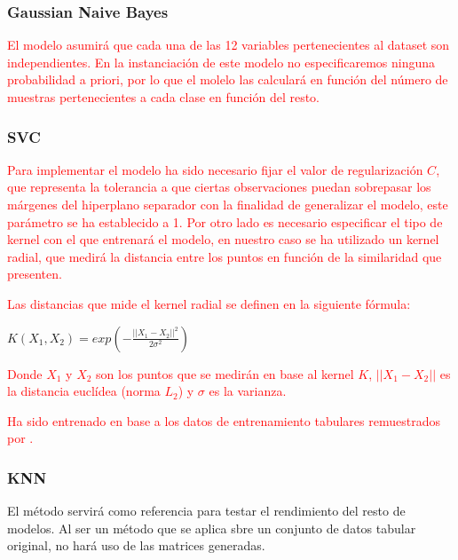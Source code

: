         \subsubsection{Gaussian Naive Bayes}

            \textcolor{red}{El modelo  asumirá que cada una de las 12 variables pertenecientes al dataset son independientes. En la instanciación de este modelo no especificaremos ninguna probabilidad a priori, por lo que el molelo las calculará en función del número de muestras pertenecientes a cada clase en función del resto.}


        \subsubsection{SVC}

            \textcolor{red}{Para implementar el modelo  ha sido necesario fijar el valor de regularización $C$, que representa la tolerancia a que ciertas observaciones puedan sobrepasar los márgenes del hiperplano separador con la finalidad de generalizar el modelo, este parámetro se ha establecido a 1. Por otro lado es necesario especificar el tipo de kernel con el que entrenará el modelo, en nuestro caso se ha utilizado un kernel radial, que medirá la distancia entre los puntos en función de la similaridad que presenten.}

            \textcolor{red}{Las distancias que mide el kernel radial se definen en la siguiente fórmula:}

            \begin{center}
                $K(X_1, X_2) = exp (- \frac{||X_1 - X_2||^2}{2 \sigma^2})$
            \end{center}

            \textcolor{red}{Donde $X_1$ y $X_2$ son los puntos que se medirán en base al kernel $K$, $||X_1 - X_2||$ es la distancia euclídea (norma $L_2$) y $\sigma$ es la varianza.}

            \textcolor{red}{ Ha sido entrenado en base a los datos de entrenamiento tabulares remuestrados por .}
        \subsubsection{KNN}

            El método  servirá como referencia para testar el rendimiento del resto de modelos. Al ser un método que se aplica sbre un conjunto de datos tabular original, no hará uso de las matrices generadas.

